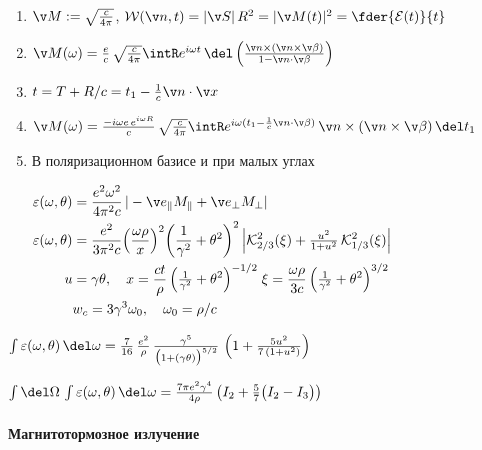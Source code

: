 \documentclass{trchesh}
\begin{document}
\begin{multicols*}{3}
\begin{enumerate}
  \item $\v M := \sqrt{c \over 4\pi}$, $\mathcal W(\v n, t) = |\v S|\, R^2 = |\v M(t)|^2 =
    \fder{\mathcal E(t)}{t}$
  \item $\v M(\omega) = \frac{e}{c} \, \sqrt{c \over 4\pi} \intR e^{i \omega t} \,\del
    \left(\frac{\v n \times (\v n \times \v \beta)}{1 - \v n \cdot \v \beta}\right)$
  \item $t = T + R/c = t_1 - \frac 1c \v n\cdot \v x$
  \item $\v M(\omega) = \frac{-i\omega e\, e^{i \omega R}}{c} \, \sqrt{c \over 4\pi} \* 
     \intR e^{i \omega (t_1 - \frac 1c \v n \cdot \v \beta)} \,
  \v n \times (\v n \times \v \beta)\, \del t_1$
  \item В поляризационном базисе и при малых углах
    \begin{small}
      $
      \begin{aligned}
        \varepsilon (\omega, \theta) &= \frac{e^2 \omega^2}{4\pi^2 c}\,|-\v e_\parallel M_\parallel + \v e_\perp M_\perp|\\
        \varepsilon (\omega, \theta) &= \frac{e^2}{3\pi^2 c} \*
        {\left(\frac{\omega \rho}{x}\right)}^2 \* {\left(\frac 1{\gamma^2} + \theta^2 \right)}^2\*
        \left\lvert \mathcal K_{2/3}^2 (\xi) + \tfrac{u^2}{1+u^2}\, \mathcal K_{1/3}^2 (\xi)\right\rvert\\
        u &= \gamma \theta, \quad
        x = \frac{ct}{\rho} \, {\left(\tfrac{1}{\gamma^2} + \theta^2\right)}^{-1/2} \;
        \xi = \frac{\omega \rho}{3c}\, {\left(\tfrac{1}{\gamma^2} + \theta^2\right)}^{3/2} \\
        & w_c = 3 \gamma^3 \omega_0,\quad \omega_0 = \rho/c
      \end{aligned}
      $
    \end{small}
\end{enumerate}

$\int \varepsilon(\omega, \theta) \, \del \omega = \frac{7}{16} \, \frac{e^2}{\rho} \, 
\frac{\gamma^5}{{\bigl(1 + (\gamma \theta)\bigr)}^{5/2}} \, \left( 1 + \frac{5 u^2}{7\,(1+u^2)}\right)$

$\int \del \Omega \, \int \varepsilon (\omega,\theta) \, \del \omega 
= \frac{7 \pi e^2 \gamma^4}{4 \rho} \left(I_2 + \frac 57\bigl(I_2 - I_3\bigr)\right)$

\paragraph{Магнитотормозное излучение}
\underdev\ \flame%


\end{multicols*}
\end{document}
